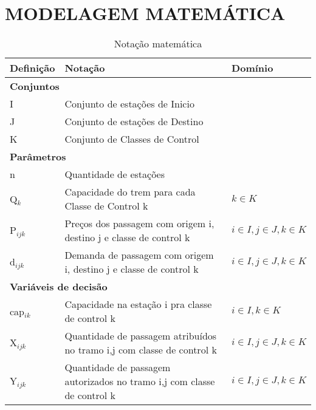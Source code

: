 \documentclass[10pt,a4paper]{article}
\begin{document}
\section{MODELAGEM MATEMÁTICA}

\begin{table}[H]
	\centering
	\small
	\begin{tabular}{@{}lll@{}}
		\toprule
		\textbf{Definição} & \textbf{Notação}                                                        & \textbf{Domínio}            \\ \midrule
		\multicolumn{3}{l}{\textbf{Conjuntos}}                                                                                     \\ \midrule
		I                  & Conjunto de estações de Inicio                                          &                             \\
		J                  & Conjunto de estações de Destino                                         &                             \\
		K                  & Conjunto de Classes de Control                                          &                             \\ \midrule
		\multicolumn{3}{l}{\textbf{Parâmetros}}                                                                                    \\ \midrule
		n                  & Quantidade de estações                                                  &                             \\
		Q$_k$              & Capacidade do trem para cada Classe de Control k                        & $k \in K$                   \\
		P$_{ijk}$          & Preços  dos passagem com origem i, destino j e classe de control k      & $i \in I, j \in J, k \in K$ \\
		d$_{ijk}$          & Demanda  de passagem com origem i, destino j e classe de control k      & $i \in I, j \in J, k \in K$ \\ \midrule
		\multicolumn{3}{l}{\textbf{Variáveis de decisão}}                                                                          \\ \midrule
		cap$_{ik}$         & Capacidade na estação i pra classe de control k                         & $i \in I, k \in K$          \\
		X$_{ijk}$          & Quantidade de passagem atribuídos no tramo i,j com classe de control k  & $i \in I, j \in J, k \in K$ \\
		Y$_{ijk}$          & Quantidade de passagem autorizados no tramo i,j com classe de control k & $i \in I, j \in J, k \in K$ \\ \bottomrule
	\end{tabular}
	\caption{Notação matemática}
	\label{Notacao}
\end{table}
\end{document}
